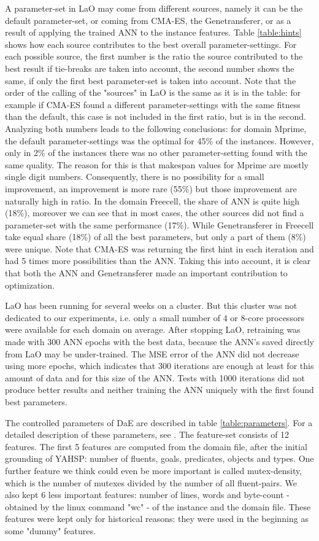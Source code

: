 \documentclass{MYsig-alternate}
\begin{document}
A parameter-set in LaO may come from different sources, namely it can be the default parameter-set, or coming from CMA-ES, the Genetransferer, or as a result of applying the trained ANN to the instance features. Table \ref{table:hints} shows how each source contributes to the best overall parameter-settings. For each possible source, the first number is the ratio the source contributed to the best result if tie-breaks are taken into account, the second number shows the same, if only the first best parameter-set is taken into account. Note that the order of the calling of the "sources" in LaO is the same as it is in the table: for example if CMA-ES found a different parameter-settings with the same fitness than the default, this case is not included in the first ratio, but is in the second. Analyzing both numbers leads to the following conclusions: for domain Mprime, the default parameter-settings was the optimal for 45\% of the instances. However, only in 2\% of the instances there was no other parameter-setting found with the same quality. The reason for this is that makespan values for Mprime are mostly single digit numbers. Consequently, there is no possibility for a small improvement, an improvement is more rare (55\%) but those improvement are naturally high in ratio. In the domain Freecell, the share of ANN is quite high (18\%), moreover we can see that in most cases, the other sources did not find a parameter-set with the same performance (17\%). While Genetransferer in Freecell take equal share (18\%) of all the best parameters, but only a part of them (8\%) were unique. Note that CMA-ES was returning the first hint in each iteration and had 5 times more possibilities than the ANN. Taking this into account, it is clear that both the ANN and Genetransferer made an important contribution to optimization.

LaO has been running for several weeks on a cluster. But this cluster was not dedicated to our experiments, i.e. only a small number of 4 or 8-core processors were available for each domain on average. After stopping LaO, retraining was made with 300 ANN epochs with the best data, because the ANN's saved directly from LaO may be under-trained. The MSE error of the ANN did not decrease using more epochs, which indicates that 300 iterations are enough at least for this amount of data and for this size of the ANN. Tests with 1000 iterations did not produce better results and neither training the ANN uniquely with the first found best parameters.

The controlled parameters of DaE are described in table \ref{table:parameters}. For a detailed description of these parameters, see \cite{BibGECCO:2010}. The feature-set consists of 12 features. The first 5 features are computed from the domain file, after the initial grounding of YAHSP: number of fluents, goals, predicates, objects and types. One further feature we think could even be more important is called mutex-density, which is the number of mutexes divided by the number of all fluent-pairs. We also kept 6 less important features: number of lines, words and byte-count - obtained by the linux command "wc" - of the instance and the domain file. These features were kept only for historical reasons: they were used in the beginning as some "dummy" features.
\end{document}
